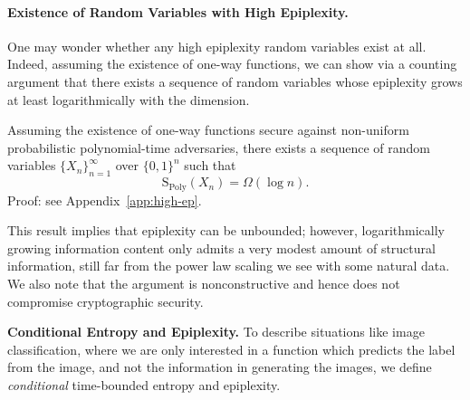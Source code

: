 \documentclass[twoside]{article}
\begin{document}
\paragraph{Existence of Random Variables with High Epiplexity.} 
One may wonder whether any high epiplexity random variables exist at all. Indeed, assuming the existence of one-way functions, we can show via a counting argument that there exists a sequence of 
%
%
%
random variables whose epiplexity grows at least logarithmically with the dimension. %
\begin{theorem}\label{thm:high-ep}
    Assuming the existence of one-way functions secure against non-uniform probabilistic polynomial-time adversaries, there exists a sequence of random variables $\{X_n\}_{n=1}^\infty$ over $\{0,1\}^n$ such that $$\mathrm{S}_{\mathrm{Poly}}(X_n) =\Omega(\log n).$$ Proof: see Appendix~\ref{app:high-ep}.
\end{theorem}
This result implies that epiplexity can be unbounded; however, logarithmically growing information content only admits a very modest amount of structural information, still far from the power law scaling we see with some natural data. We also note that the argument is nonconstructive and hence does not compromise cryptographic security.
%
%
%
%
%




%
%
%
%
%
%

%
%
%
%
%
%
%
%
%
%
%
%
%
%

%
%
%
%

%

%

%

%



%
%
%
%
%
%
%
%
%
%
%
%
%
%
%
%
%


%
%
%
%

%
%
%
%
%
\textbf{Conditional Entropy and Epiplexity.}
To describe situations like image classification, 
where we are only interested in a function which predicts the label from the image, and not the information in generating the images, we define \emph{conditional} time-bounded entropy and epiplexity.

%
%

%
%
%
%
%
%
%

%
%
%
%
%
%
\end{document}
